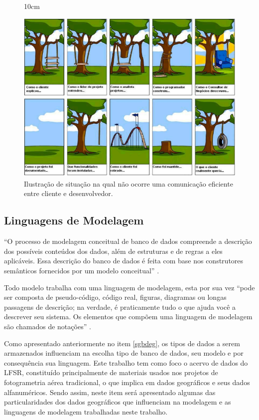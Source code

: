 \begin{figure}[!ht]{10cm}
  \caption{Ilustração de situação na qual não ocorre uma comunicação eficiente entre cliente e desenvolvedor.} \label{comunicado}
  \includegraphics[width=1\hsize]{figuras/requisitos_malcomunicados.png}
\end{figure}

\subsection{Linguagens de Modelagem} \label{itemmodl}

\begin{citacao}
``O processo de modelagem conceitual de banco de dados compreende a descrição dos possíveis conteúdos dos dados, além de estruturas e de regras a eles aplicáveis. Essa descrição do banco de dados é feita com base nos construtores semânticos fornecidos por um modelo conceitual'' \cite[p.20]{lisboa2001modelagem}. 
\end{citacao}

Todo modelo trabalha com uma linguagem de modelagem, esta por sua vez ``pode ser composta de pseudo-código, código real, figuras, diagramas ou longas passagens de descrição; na verdade, é praticamente tudo o que ajuda
você a descrever seu sistema. Os elementos que compõem uma linguagem de modelagem são chamados
de notações'' \cite[p.2]{miles2006learning}.

Como apresentado anteriormente no item \ref{sgbdeg}, os tipos de dados a serem armazenados influenciam na escolha tipo de banco de dados, seu modelo e por consequência sua linguagem. Este trabalho tem como foco o acervo de dados do LFSR, constituído principalmente de materiais usados nos projetos de fotogrametria aérea tradicional, o que implica em dados geográficos e seus dados alfanuméricos. Sendo assim, neste item será apresentado algumas das particularidades dos dados geográficos que influenciam na modelagem e as linguagens de modelagem trabalhadas neste trabalho.

